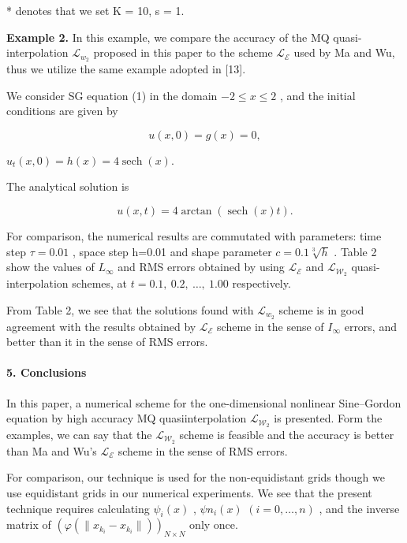 \documentclass[12pt]{article}
\begin{document}
* denotes that we set K = 10, s = 1.

\textbf{Example 2.} In this example, we compare the accuracy of the MQ quasi-interpolation \(\mathcal{L}_{w_2}\) proposed in this paper to the scheme \(\mathcal{L}_{\mathcal{E}}\) used by Ma and Wu, thus we utilize the same example adopted in {[}13{]}.

We consider SG equation (1) in the domain \(-2 \le x \le 2\) , and the initial conditions are given by

\[u(x, 0) = g(x) = 0,\]

\(u_t(x, 0) = h(x) = 4\operatorname{sech}(x).\)

The analytical solution is

\[u(x, t) = 4 \arctan(\operatorname{sech}(x)t).\]

For comparison, the numerical results are commutated with parameters:
time step \(\tau=0.01\) , space step h=0.01 and shape parameter \(c=0.1\sqrt[3]{h}\) . Table 2 show the values of \(L_{\infty}\) and RMS errors obtained by using \(\mathcal{L}_{\mathcal{E}}\) and
\(\mathcal{L}_{\mathcal{W}_2}\) quasi-interpolation schemes, at \(t=0.1,\ 0.2,\ \ldots,\ 1.00\) respectively.

\protect\hypertarget{page-5-0}{}{}From Table 2, we see that the solutions found with \(\mathcal{L}_{w_2}\) scheme is in good agreement with the results obtained by \(\mathcal{L}_{\mathcal{E}}\) scheme in the sense of \(I_{\infty}\) errors, and better than it in the sense of RMS
errors.

\hypertarget{conclusions}{%
\paragraph{5. Conclusions}\label{conclusions}}

In this paper, a numerical scheme for the one-dimensional nonlinear Sine--Gordon equation by high accuracy MQ quasiinterpolation \(\mathcal{L}_{\mathcal{W}_2}\) is presented. Form the examples, we can say that the \(\mathcal{L}_{\mathcal{W}_2}\) scheme is feasible and the
accuracy is better than Ma and Wu's \(\mathcal{L}_{\mathcal{E}}\) scheme in the sense of RMS errors.

For comparison, our technique is used for the non-equidistant grids though we use equidistant grids in our numerical experiments. We see that the present technique requires calculating \(\psi_i(x)\) , \(\psi n_i(x)\) \((i=0,\ldots,n)\) , and the inverse matrix of
\((\varphi(\|x_{k_i}-x_{k_i}\|))_{N\times N}\) only once.
\end{document}
